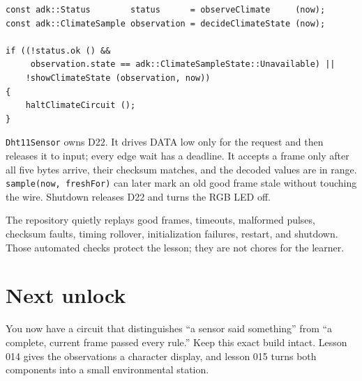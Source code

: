 \documentclass[11pt]{article}
\begin{document}
\begin{lstlisting}[style=adkcpp]
const adk::Status        status      = observeClimate     (now);
const adk::ClimateSample observation = decideClimateState (now);

if ((!status.ok () &&
     observation.state == adk::ClimateSampleState::Unavailable) ||
    !showClimateState (observation, now))
{
    haltClimateCircuit ();
}
\end{lstlisting}

\texttt{Dht11Sensor} owns D22. It drives DATA low only for the request and then
releases it to input; every edge wait has a deadline. It accepts a frame only
after all five bytes arrive, their checksum matches, and the decoded values are
in range. \texttt{sample(now, freshFor)} can later mark an old good frame stale
without touching the wire. Shutdown releases D22 and turns the RGB LED off.

The repository quietly replays good frames, timeouts, malformed pulses,
checksum faults, timing rollover, initialization failures, restart, and
shutdown. Those automated checks protect the lesson; they are not chores for
the learner.

\section{Next unlock}

You now have a circuit that distinguishes ``a sensor said something'' from
``a complete, current frame passed every rule.'' Keep this exact build intact.
Lesson 014 gives the observations a character display, and lesson 015 turns
both components into a small environmental station.
\end{document}
